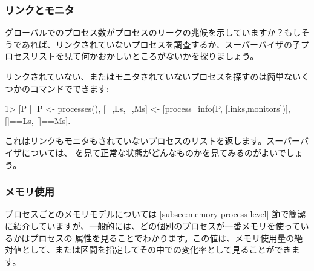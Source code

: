 \subsubsection{リンクとモニタ}

グローバルでのプロセス数がプロセスのリークの兆候を示していますか？もしそうであれば、リンクされていないプロセスを調査するか、スーパーバイザの子プロセスリストを見て何かおかしいところがないかを探りましょう。

リンクされていない、またはモニタされていないプロセスを探すのは簡単ないくつかのコマンドでできます:

\begin{VerbatimEshell}
1> [P || P <- processes(),
         [{_,Ls},{_,Ms}] <- [process_info(P, [links,monitors])],
         []==Ls, []==Ms].
\end{VerbatimEshell}

これはリンクもモニタもされていないプロセスのリストを返します。スーパーバイザについては、 を見て正常な状態がどんなものかを見てみるのがよいでしょう。

\subsubsection{メモリ使用}

プロセスごとのメモリモデルについては \ref{subsec:memory-process-level} 節で簡潔に紹介していますが、一般的には、どの個別のプロセスが一番メモリを使っているかはプロセスの  属性を見ることでわかります。この値は、メモリ使用量の絶対値として、または区間を指定してその中での変化率として見ることができます。


